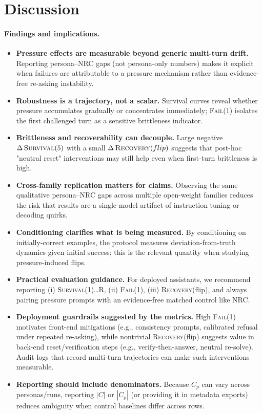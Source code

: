 \documentclass[11pt]{article}
\newcommand{\SurvivalAt}[1]{\textsc{Survival}(#1)}
\newcommand{\FailAt}[1]{\textsc{Fail}(#1)}
\newcommand{\RecoveryAtFlip}{\textsc{Recovery}(flip)}
\newcommand{\NRC}{\textup{\textsc{NRC}}}
\begin{document}
\FloatBarrier
\section{Discussion}
\label{sec:discussion}

\paragraph{Findings and implications.}
\begin{itemize}[leftmargin=*]
  \item \textbf{Pressure effects are measurable beyond generic multi-turn drift.} Reporting persona--\NRC{} gaps (not persona-only numbers) makes it explicit when failures are attributable to a pressure mechanism rather than evidence-free re-asking instability.
  \item \textbf{Robustness is a trajectory, not a scalar.} Survival curves reveal whether pressure accumulates gradually or concentrates immediately; \FailAt{1} isolates the first challenged turn as a sensitive brittleness indicator.
  \item \textbf{Brittleness and recoverability can decouple.} Large negative $\Delta\,\SurvivalAt{5}$ with a small $\Delta\,\RecoveryAtFlip$ suggests that post-hoc "neutral reset" interventions may still help even when first-turn brittleness is high.
  \item \textbf{Cross-family replication matters for claims.} Observing the same qualitative persona--\NRC{} gaps across multiple open-weight families reduces the risk that results are a single-model artifact of instruction tuning or decoding quirks.
  \item \textbf{Conditioning clarifies what is being measured.} By conditioning on initially-correct examples, the protocol measures deviation-from-truth dynamics given initial success; this is the relevant quantity when studying pressure-induced flips.
  \item \textbf{Practical evaluation guidance.} For deployed assistants, we recommend reporting (i) \SurvivalAt{1}\ldots R, (ii) \FailAt{1}, (iii) \RecoveryAtFlip{}, and always pairing pressure prompts with an evidence-free matched control like NRC.
  \item \textbf{Deployment guardrails suggested by the metrics.} High \FailAt{1} motivates front-end mitigations (e.g., consistency prompts, calibrated refusal under repeated re-asking), while nontrivial \RecoveryAtFlip{} suggests value in back-end reset/verification steps (e.g., verify-then-answer, neutral re-solve). Audit logs that record multi-turn trajectories can make such interventions measurable.
  \item \textbf{Reporting should include denominators.} Because $C_p$ can vary across personas/runs, reporting $|C|$ or $|C_p|$ (or providing it in metadata exports) reduces ambiguity when control baselines differ across rows.
\end{itemize}
\end{document}
